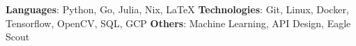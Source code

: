 \textbf{Languages}{: Python, Go, Julia, Nix, LaTeX}
\newline
\textbf{Technologies}{: Git, Linux, Docker, Tensorflow, OpenCV, SQL, GCP}
\newline
\textbf{Others}{: Machine Learning, API Design, Eagle Scout}
